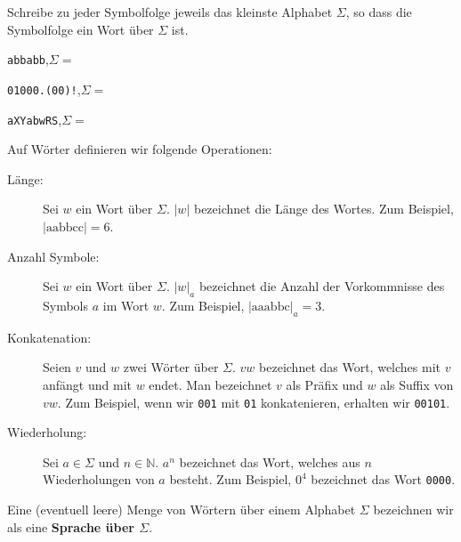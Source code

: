 \documentclass{article}
\newcommand{\abs}[1]{\lvert#1\rvert}
\begin{document}
\begin{exercise}[solution=true]
Schreibe zu jeder Symbolfolge jeweils das kleinste Alphabet \(\Sigma\), so dass die Symbolfolge ein Wort über \(\Sigma\) ist.
\begin{enumerate}[(a)]
{
    \item \texttt{abbabb},\hfill \(\Sigma = \)
    \item \texttt{01000.(00)!},\hfill \(\Sigma = \)
    \item \texttt{aXYabwRS},\hfill \(\Sigma = \)
    
}
\end{enumerate}
\end{exercise}

\begin{definition}
Auf Wörter definieren wir folgende Operationen:
\begin{description}
    \item[Länge:] Sei \(w\) ein Wort über \(\Sigma\). \(\abs{w}\) bezeichnet die Länge des Wortes. Zum Beispiel, \(\abs{\text{aabbcc}}=6\).
    \item[Anzahl Symbole:] Sei \(w\) ein Wort über \(\Sigma\). \(\abs{w}_a\) bezeichnet die Anzahl der Vorkommnisse des Symbols \(a\) im Wort \(w\). Zum Beispiel, \(\abs{\text{aaabbc}}_a=3\).
    \item[Konkatenation:] Seien \(v\) und \(w\) zwei Wörter über \(\Sigma\). \(vw\) bezeichnet das Wort, welches mit \(v\) anfängt und mit \(w\) endet. Man bezeichnet \(v\) als Präfix und \(w\) als Suffix von \(vw\). Zum Beispiel, wenn wir \texttt{001} mit \texttt{01} konkatenieren, erhalten wir \texttt{00101}.
    \item[Wiederholung:] Sei \(a \in \Sigma\) und \(n \in \mathbb{N}\). \(a^n\) bezeichnet das Wort, welches aus \(n\) Wiederholungen von \(a\) besteht. Zum Beispiel, \(\text{0}^4\) bezeichnet das Wort \texttt{0000}.
\end{description}
\end{definition}

\begin{definition}
Eine (eventuell leere) Menge von Wörtern über einem Alphabet \(\Sigma\) bezeichnen wir als eine \textbf{Sprache über \(\Sigma\)}. 
\end{definition}
\end{document}
